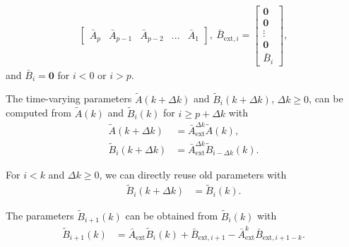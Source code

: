 \documentclass{article}
\begin{document}
\begin{theorem}
\begin{align}
\begin{bmatrix}
        \bar{A}_{p} & \bar{A}_{p-1} &  \bar{A}_{p-2} & ...&  \bar{A}_{1}
    \end{bmatrix},%
    ~ \bar{B}_{\text{ext},i} = \begin{bmatrix}
        \mathbf{0} \\
        \mathbf{0} \\
        \vdots\\
        \mathbf{0}       \\
        \bar{B}_{i} 
    \end{bmatrix}\label{eq:Btilde}  ,
\end{align}
and $\bar{B}_{i}=\mathbf{0}$ for $i< 0$ or $i>p$. 
\end{theorem}

\setcounter{equation}{13}
\begin{lemma}\label{lem:recParam}
The time-varying parameters $\tilde{A}(k+\Delta k)$ and $\tilde{B}_{i}(k+\Delta k)$, $\Delta k\geq 0$, can be
computed from $\tilde{A}(k)$ and $\tilde{B}_{i}(k)$ for $i \geq p + \Delta k$ with   
\begin{subequations}\label{eq:ARMAXtvp_paramRec}
    \begin{align}
    \tilde{A}(k+\Delta k) &= \bar{A}_{\text{ext}}^{\Delta k}  \tilde{A}(k), \label{eq:ARMAXtvp_paramRecA}\\
    \tilde{B}_{i}(k+\Delta k) &= \bar{A}_{\text{ext}}^{\Delta k} \tilde{B}_{i-\Delta k}(k).
    \label{eq:ARMAXtvp_paramRecB}
\end{align}
\end{subequations}
\end{lemma}

\begin{lemma}\label{lem:recParam2} For $i< k$ and $\Delta k \geq 0$, we can directly reuse old parameters with
\begin{align}
    \tilde{B}_{i}(k+\Delta k) &= \tilde{B}_{i}(k). \label{eq:ARMAXtvp_paramRecB2}
\end{align}
\end{lemma}

\begin{lemma}\label{lem:recParam3} The parameters $\tilde{B}_{i+1}(k)$ can be obtained from $\tilde{B}_{i}(k)$ with
\begin{align}
    \tilde{B}_{i+1}(k) &= \bar{A}_\text{ext}\tilde{B}_{i}(k) + \bar{B}_{\text{ext},i+1} - \bar{A}_\text{ext}^{k}\bar{B}_{\text{ext},i+1-k}. \label{eq:ARMAXtvp_paramRecB3}
\end{align}
\end{lemma}
\end{document}
